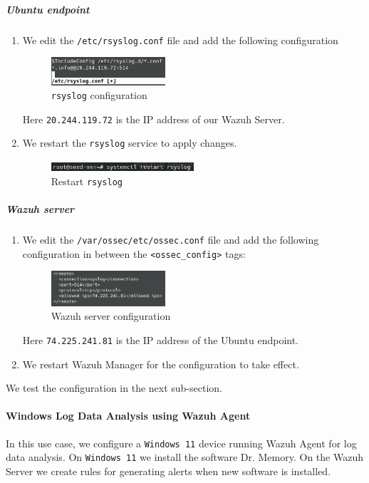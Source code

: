 \subparagraph{Ubuntu endpoint}
\begin{enumerate}
    \item We edit the \texttt{/etc/rsyslog.conf} file and add the following configuration
    \begin{figure} [H]
    \centering
    \includegraphics[width=0.4\textwidth]{images/log-data/1.png}
    \caption{\texttt{rsyslog} configuration}
    \end{figure}
    Here \texttt{20.244.119.72} is the IP address of our Wazuh Server.
    \item We restart the \texttt{rsyslog} service to apply changes.
    \begin{figure} [H]
    \centering
    \includegraphics[width=0.5\textwidth]{images/log-data/2.png}
    \caption{Restart \texttt{rsyslog}}
    \end{figure}
\end{enumerate}

\subparagraph{Wazuh server}
\begin{enumerate}
    \item We edit the \texttt{/var/ossec/etc/ossec.conf} file and add the following configuration in between the \texttt{<ossec\_config>} tags:
    \begin{figure} [H]
    \centering
    \includegraphics[width=0.4\textwidth]{images/log-data/3.png}
    \caption{Wazuh server configuration}
    \end{figure}
    Here \texttt{74.225.241.81} is the IP address of the Ubuntu endpoint.
    
    \item We restart Wazuh Manager for the configuration to take effect.
\end{enumerate}

We test the configuration in the next sub-section. 

\paragraph{Windows Log Data Analysis using Wazuh Agent}
In this use case, we configure a \texttt{Windows 11} device running Wazuh Agent for log data analysis. On \texttt{Windows 11} we install the software Dr. Memory. On the Wazuh Server we create rules for generating alerts when new software is installed.

